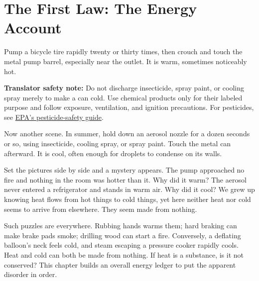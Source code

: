 \chapter{The First Law: The Energy Account}


\begin{mainline}
Pump a bicycle tire rapidly twenty or thirty times, then crouch and touch the metal pump barrel, especially near the outlet. It is warm, sometimes noticeably hot.

\textbf{Translator safety note:} Do not discharge insecticide, spray paint, or cooling spray merely to make a can cold. Use chemical products only for their labeled purpose and follow exposure, ventilation, and ignition precautions. For pesticides, see \href{https://www.epa.gov/sites/default/files/2017-08/documents/citizens_guide_to_pest_control_and_pesticide_safety.pdf}{EPA's pesticide-safety guide}.

Now another scene. In summer, hold down an aerosol nozzle for a dozen seconds or so, using insecticide, cooling spray, or spray paint. Touch the metal can afterward. It is cool, often enough for droplets to condense on its walls.

Set the pictures side by side and a mystery appears. The pump approached no fire and nothing in the room was hotter than it. Why did it warm? The aerosol never entered a refrigerator and stands in warm air. Why did it cool? We grew up knowing heat flows from hot things to cold things, yet here neither heat nor cold seems to arrive from elsewhere. They seem made from nothing.

Such puzzles are everywhere. Rubbing hands warms them; hard braking can make brake pads smoke; drilling wood can start a fire. Conversely, a deflating balloon's neck feels cold, and steam escaping a pressure cooker rapidly cools. Heat and cold can both be made from nothing. If heat is a substance, is it not conserved? This chapter builds an overall energy ledger to put the apparent disorder in order.
\end{mainline}


